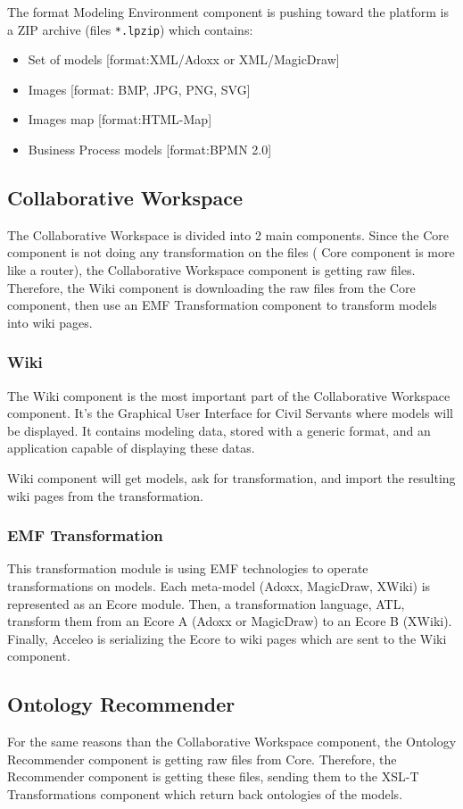 \documentclass{learnpad}
\begin{document}
The format Modeling Environment component is pushing toward the \learnpad
platform is a ZIP archive (files \verb+*.lpzip+) which contains:
\begin{itemize}
	\item Set of models [format:XML/Adoxx or XML/MagicDraw]
	\item Images [format: BMP, JPG, PNG, SVG]
	\item Images map [format:HTML-Map]
	\item Business Process models [format:BPMN 2.0]
\end{itemize}

\subsection{Collaborative Workspace}
The Collaborative Workspace is divided into 2 main components.  Since the
\learnpad Core component is not doing any transformation on the files (\learnpad
Core component is more like a router), the Collaborative Workspace component is
getting raw files.  Therefore, the Wiki component is downloading the raw files
from the \learnpad Core component, then use an EMF Transformation component to
transform models into wiki pages.

\subsubsection{Wiki}
The Wiki component is the most important part of the Collaborative Workspace
component.  It's the Graphical User Interface for Civil Servants where models
will be displayed.  It contains modeling data, stored with a generic format, and
an application capable of displaying these datas.

Wiki component will get models, ask for transformation, and import the resulting
wiki pages from the transformation.

\subsubsection{EMF Transformation}
This transformation module is using EMF technologies to operate transformations
on models.  Each meta-model (Adoxx, MagicDraw, XWiki) is represented as an Ecore
module.  Then, a transformation language, ATL, transform them from an Ecore A
(Adoxx or MagicDraw) to an Ecore B (XWiki).  Finally, Acceleo is serializing the
Ecore to wiki pages which are sent to the Wiki component.

\subsection{Ontology Recommender}
For the same reasons than the Collaborative Workspace component, the Ontology
Recommender component is getting raw files from \learnpad Core.  Therefore, the
Recommender component is getting these files, sending them to the XSL-T
Transformations component which return back ontologies of the models.
\end{document}
